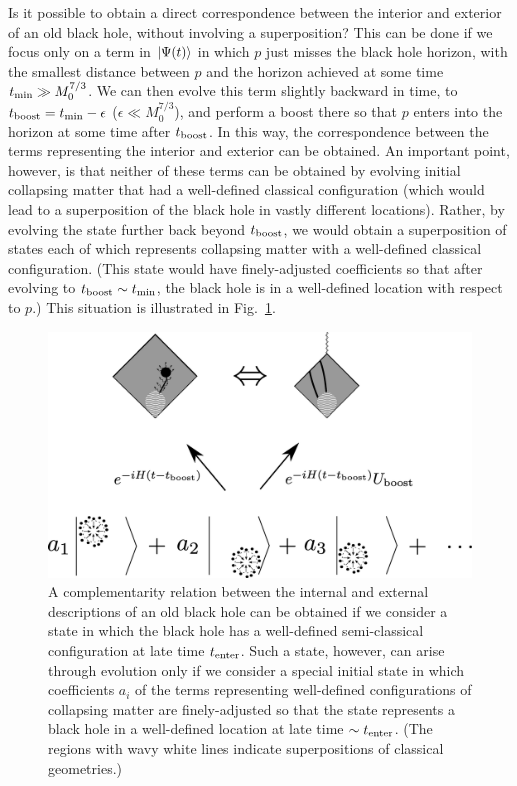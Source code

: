\documentclass[12pt]{article}
\begin{document}
Is it possible to obtain a direct correspondence between the interior and 
exterior of an old black hole, without involving a superposition?  This 
can be done if we focus only on a term in $\left| \Psi(t) \right>$ in which $p$ 
just misses the black hole horizon, with the smallest distance between 
$p$ and the horizon achieved at some time $t_{\rm min} \gg M_0^{7/3}$. 
We can then evolve this term slightly backward in time, to $t_{\rm boost} 
= t_{\rm min} - \epsilon$ ($\epsilon \ll M_0^{7/3}$), and perform a boost 
there so that $p$ enters into the horizon at some time after $t_{\rm boost}$. 
In this way, the correspondence between the terms representing the interior 
and exterior can be obtained.  An important point, however, is that neither 
of these terms can be obtained by evolving initial collapsing matter 
that had a well-defined classical configuration (which would lead to 
a superposition of the black hole in vastly different locations).  Rather, 
by evolving the state further back beyond $t_{\rm boost}$, we would obtain 
a superposition of states each of which represents collapsing matter 
with a well-defined classical configuration.  (This state would have 
finely-adjusted coefficients so that after evolving to $t_{\rm boost} 
\sim t_{\rm min}$, the black hole is in a well-defined location with 
respect to $p$.)  This situation is illustrated in Fig.~\ref{fig:compl-2}.
%
\begin{figure}[t]
\begin{center}
  \includegraphics[width=14cm]{figure/compl-2.eps}
\caption{A complementarity relation between the internal and external 
 descriptions of an old black hole can be obtained if we consider a state 
 in which the black hole has a well-defined semi-classical configuration 
 at late time $t_{\rm enter}$.  Such a state, however, can arise through 
 evolution only if we consider a special initial state in which coefficients 
 $a_i$ of the terms representing well-defined configurations of collapsing 
 matter are finely-adjusted so that the state represents a black hole in 
 a well-defined location at late time $\sim t_{\rm enter}$.  (The regions 
 with wavy white lines indicate superpositions of classical geometries.)}
\label{fig:compl-2}
\end{center}
\end{figure}
%
\end{document}
